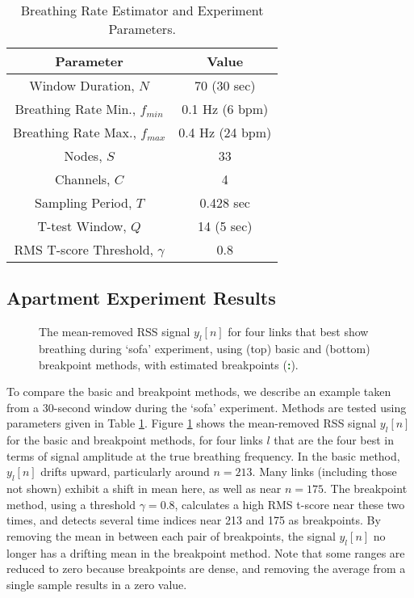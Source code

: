 \documentclass[10pt,journal,letterpaper]{IEEEtran}
\begin{document}
\begin{table}[tbp]
\begin{center}
\begin{tabular}{|cc|}
\hline
\bf Parameter & \bf Value \\
\hline
Window Duration, $N$ & 70 (30 sec) \\
Breathing Rate Min., $f_{min}$ & 0.1 Hz (6 bpm) \\
Breathing Rate Max., $f_{max}$ & 0.4 Hz (24 bpm) \\
Nodes, $S$ & 33 \\
Channels, $C$ & 4 \\
Sampling Period, $T$ & 0.428 sec \\
T-test Window, $Q$ & 14 (5 sec)\\
RMS T-score Threshold, $\gamma$ & 0.8 \\
\hline
\end{tabular}
\end{center}
\caption{Breathing Rate Estimator and Experiment Parameters. } \label{T:Parameters}
\end{table}


\subsection{Apartment Experiment Results}

\begin{figure}[hbtp]
\centerline{  }
\caption{The mean-removed RSS signal $y_l[n]$ for four links that best show breathing during `sofa' experiment, using (top) basic and (bottom) breakpoint methods, with estimated breakpoints (\textcolor{darkgreen}{\bf :}).}
    \label{F:RSSSignal_2}
\end{figure}

To compare the basic and breakpoint methods, we describe an example taken from a 30-second window during the `sofa' experiment.  Methods are tested using parameters given in Table \ref{T:Parameters}.  Figure \ref{F:RSSSignal_2} shows the mean-removed RSS signal $y_l[n]$ for the basic and breakpoint methods, for four links $l$ that are the four best in terms of signal amplitude at the true breathing frequency.   In the basic method, $y_l[n]$ drifts upward, particularly around $n=213$.  Many links (including those not shown) exhibit a shift in mean here, as well as near $n=175$.  The breakpoint method, using a threshold $\gamma=0.8$, calculates a high RMS t-score near these two times, and detects several time indices near 213 and 175 as breakpoints.  By removing the mean in between each pair of breakpoints, the signal $y_l[n]$ no longer has a drifting mean in the breakpoint method.  Note that some ranges are reduced to zero because breakpoints are dense, and removing the average from a single sample results in 
a zero value.
\end{document}
